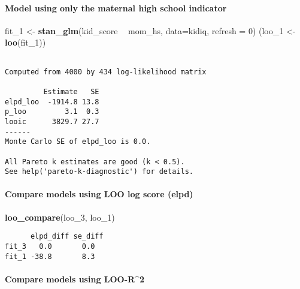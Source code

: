 \documentclass[
]{article}
\newenvironment{Shaded}{\begin{snugshade}}{\end{snugshade}}
\newcommand{\DataTypeTok}[1]{\textcolor[rgb]{0.13,0.29,0.53}{#1}}
\newcommand{\DecValTok}[1]{\textcolor[rgb]{0.00,0.00,0.81}{#1}}
\newcommand{\KeywordTok}[1]{\textcolor[rgb]{0.13,0.29,0.53}{\textbf{#1}}}
\newcommand{\NormalTok}[1]{#1}
\newcommand{\OperatorTok}[1]{\textcolor[rgb]{0.81,0.36,0.00}{\textbf{#1}}}
\newcommand{\StringTok}[1]{\textcolor[rgb]{0.31,0.60,0.02}{#1}}
\begin{document}
\hypertarget{model-using-only-the-maternal-high-school-indicator}{%
\paragraph{Model using only the maternal high school
indicator}\label{model-using-only-the-maternal-high-school-indicator}}

\begin{Shaded}
\begin{Highlighting}[]
\NormalTok{fit_}\DecValTok{1}\NormalTok{ <-}\StringTok{ }\KeywordTok{stan_glm}\NormalTok{(kid_score }\OperatorTok{~}\StringTok{ }\NormalTok{mom_hs, }\DataTypeTok{data=}\NormalTok{kidiq, }\DataTypeTok{refresh =} \DecValTok{0}\NormalTok{)}
\NormalTok{(loo_}\DecValTok{1}\NormalTok{ <-}\StringTok{ }\KeywordTok{loo}\NormalTok{(fit_}\DecValTok{1}\NormalTok{))}
\end{Highlighting}
\end{Shaded}

\begin{verbatim}

Computed from 4000 by 434 log-likelihood matrix

         Estimate   SE
elpd_loo  -1914.8 13.8
p_loo         3.1  0.3
looic      3829.7 27.7
------
Monte Carlo SE of elpd_loo is 0.0.

All Pareto k estimates are good (k < 0.5).
See help('pareto-k-diagnostic') for details.
\end{verbatim}

\hypertarget{compare-models-using-loo-log-score-elpd}{%
\paragraph{Compare models using LOO log score
(elpd)}\label{compare-models-using-loo-log-score-elpd}}

\begin{Shaded}
\begin{Highlighting}[]
\KeywordTok{loo_compare}\NormalTok{(loo_}\DecValTok{3}\NormalTok{, loo_}\DecValTok{1}\NormalTok{)}
\end{Highlighting}
\end{Shaded}

\begin{verbatim}
      elpd_diff se_diff
fit_3   0.0       0.0  
fit_1 -38.8       8.3  
\end{verbatim}

\hypertarget{compare-models-using-loo-r2}{%
\paragraph{Compare models using
LOO-R\^{}2}\label{compare-models-using-loo-r2}}
\end{document}
